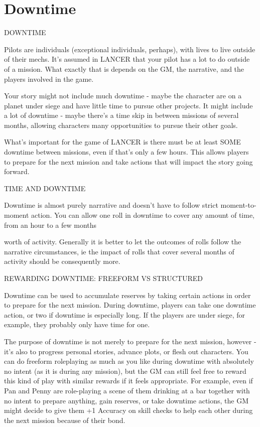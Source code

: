 \section{Downtime}
                                             DOWNTIME


Pilots are individuals (exceptional individuals, perhaps), with lives to live outside of their mechs.
It’s assumed in LANCER that your pilot has a lot to do outside of a mission. What exactly that is
depends on the GM, the narrative, and the players involved in the game.


Your story might not include much downtime - maybe the character are on a planet under siege
and have little time to pursue other projects. It might include a lot of downtime - maybe there’s a
time skip in between missions of several months, allowing characters many opportunities to
pursue their other goals.


What’s important for the game of LANCER is there must be at least SOME downtime between
missions, even if that’s only a few hours. This allows players to prepare for the next mission and
take actions that will impact the story going forward.


                                           TIME AND DOWNTIME


Downtime is almost purely narrative and doesn’t have to follow strict moment-to-moment action.
You can allow one roll in downtime to cover any amount of time, from an hour to a few months




worth of activity. Generally it is better to let the outcomes of rolls follow the narrative
circumstances, ie the impact of rolls that cover several months of activity should be
consequently more.


                      REWARDING DOWNTIME: FREEFORM VS STRUCTURED


Downtime can be used to accumulate reserves by taking certain actions in order to prepare for
the next mission. During downtime, players can take one downtime action, or two if downtime is
especially long. If the players are under siege, for example, they probably only have time for one.


The purpose of downtime is not merely to prepare for the next mission, however - it’s also to
progress personal stories, advance plots, or flesh out characters. You can do freeform
roleplaying as much as you like during downtime with absolutely no intent (as it is during any
mission), but the GM can still feel free to reward this kind of play with similar rewards if it
feels appropriate. For example, even if Pan and Penny are role-playing a scene of them drinking
at a bar together with no intent to prepare anything, gain reserves, or take downtime actions, the
GM might decide to give them +1 Accuracy on skill checks to help each other during the next
mission because of their bond.


